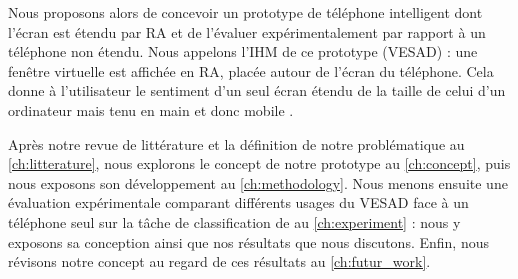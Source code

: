 
Nous proposons alors de concevoir un prototype de téléphone intelligent dont l'écran est étendu par RA et de l'évaluer expérimentalement par rapport à un téléphone non étendu. Nous appelons l'IHM de ce prototype  (VESAD) : une fenêtre virtuelle est affichée en RA, placée autour de l'écran du téléphone. Cela donne à l'utilisateur le sentiment d'un seul écran étendu de la taille de celui d'un ordinateur mais tenu en main et donc mobile .

Après notre revue de littérature et la définition de notre problématique au \autoref{ch:litterature}, nous explorons le concept de notre prototype au \autoref{ch:concept}, puis nous exposons son développement au \autoref{ch:methodology}. Nous menons ensuite une évaluation expérimentale comparant différents usages du VESAD face à un téléphone seul sur la tâche de classification de \cite{Liu2014} au \autoref{ch:experiment} : nous y exposons sa conception ainsi que nos résultats que nous discutons. Enfin, nous révisons notre concept au regard de ces résultats au \autoref{ch:futur_work}.